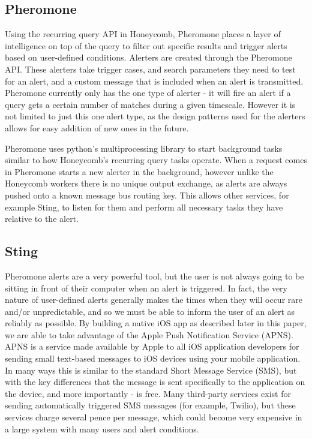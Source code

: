 \subsection{Pheromone}

Using the recurring query API in Honeycomb, Pheromone places a layer of
intelligence on top of the query to filter out specific results and trigger
alerts based on user-defined conditions. Alerters are created through the
Pheromone API. These alerters take trigger cases, and search parameters they
need to test for an alert, and a custom message that is included when an alert
is transmitted. Pheromone currently only has the one type of alerter - it will
fire an alert if a query gets a certain number of matches during a given
timescale. However it is not limited to just this one alert type, as the design
patterns used for the alerters allows for easy addition of new ones in the
future.

Pheromone uses python's multiprocessing library to start background tasks
similar to how Honeycomb’s recurring query tasks operate. When a request comes
in Pheromone starts a new alerter in the background, however unlike the
Honeycomb workers there is no unique output exchange, as alerts are always
pushed onto a known message bus routing key. This allows other services, for
example Sting, to listen for them and perform all necessary tasks they have
relative to the alert.

\subsection{Sting}

Pheromone alerts are a very powerful tool, but the user is not always going to
be sitting in front of their computer when an alert is triggered. In fact, the
very nature of user-defined alerts generally makes the times when they will
occur rare and/or unpredictable, and so we must be able to inform the user of an
alert as reliably as possible. By building a native iOS\cite{ios} app as described
later in this paper, we are able to take advantage of the Apple Push
Notification Service (APNS)\cite{apns}. APNS is a service made available by Apple to
all iOS application developers for sending small text-based messages to iOS
devices using your mobile application. In many ways this is similar to the
standard Short Message Service (SMS), but with the key differences that the
message is sent specifically to the application on the device, and more
importantly - is free. Many third-party services exist for sending automatically
triggered SMS messages (for example, Twilio\cite{twilio}), but these services charge
several pence per message, which could become very expensive in a large system
with many users and alert conditions.


